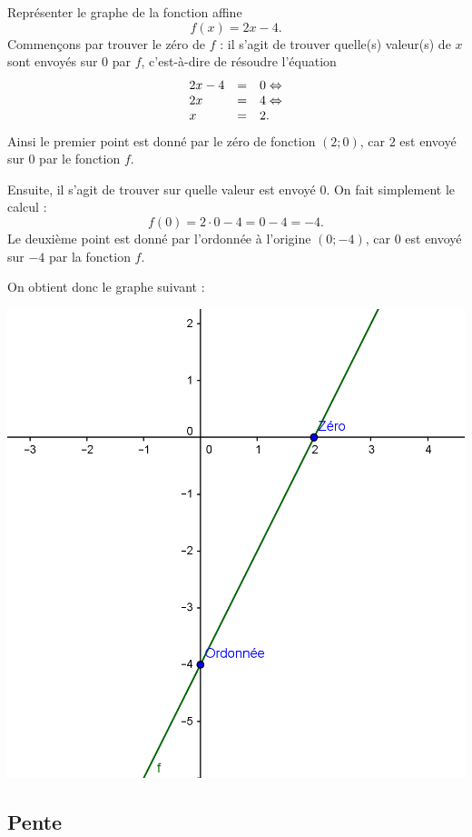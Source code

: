\begin{exemple}
Représenter le graphe de la fonction affine
$$
f(x) = 2x-4.
$$
Commençons par trouver le zéro de $f$ : il s'agit de trouver quelle(s) valeur(s) de $x$ sont envoyés sur $0$ par $f$, c'est-à-dire de résoudre l'équation
$$
\begin{array}{lcl}
2x-4 &=& 0 \Leftrightarrow\\
2x &=& 4 \Leftrightarrow \\
x &=& 2.
\end{array}
$$
Ainsi le premier point est donné par le zéro de fonction $(2;0)$, car $2$ est envoyé sur $0$ par le fonction $f$.

Ensuite, il s'agit de trouver sur quelle valeur est envoyé $0$. On fait simplement le calcul :
$$
f(0) = 2\cdot 0 -4 = 0-4 = -4.
$$
Le deuxième point est donné par l'ordonnée à l'origine $(0;-4)$, car $0$ est envoyé sur $-4$ par la fonction $f$.

On obtient donc le graphe suivant :
\begin{center}
\includegraphics{affines/fct_affine_ex.png}
\end{center}
\end{exemple}

\subsection{Pente}

